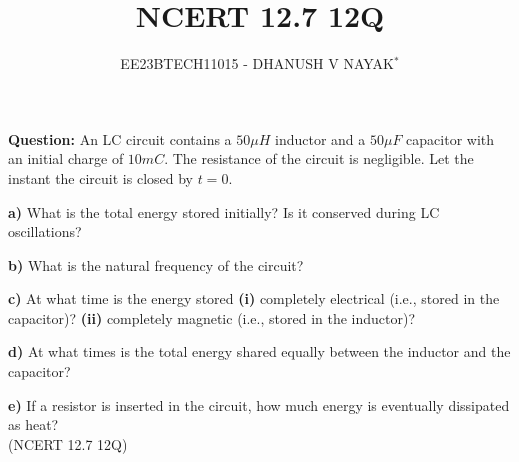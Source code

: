 \documentclass[journal,12pt,twocolumn]{IEEEtran}
\theoremstyle{remark}
\begin{document}

\vspace{3cm}
\title{NCERT 12.7 12Q}
\author{EE23BTECH11015 - DHANUSH V NAYAK$^{*}$%
}
\maketitle
\newpage
\bigskip
\renewcommand{\thefigure}{\arabic{figure}}
\renewcommand{\thetable}{\theenumi}


\textbf{Question:} An LC circuit contains a $50 \mu H$ inductor and a $50 \mu F$ capacitor with an initial charge of $10 mC$. The resistance of the circuit is negligible. Let the instant the circuit is closed by $t = 0$.

\textbf{a)} What is the total energy stored initially? Is it conserved during LC oscillations?

\textbf{b)} What is the natural frequency of the circuit?

\textbf{c)} At what time is the energy stored \textbf{(i)} completely electrical (i.e., stored in the capacitor)? \textbf{(ii)} completely magnetic (i.e., stored in the inductor)?

\textbf{d)} At what times is the total energy shared equally between the inductor and the capacitor?

\textbf{e)} If a resistor is inserted in the circuit, how much energy is eventually dissipated as heat? \\
\hfill(NCERT 12.7 12Q)\\
\solution

\end{document}
